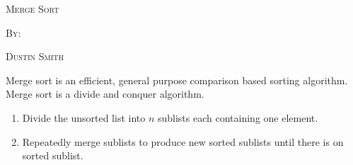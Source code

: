 \documentclass[12pt,dvipsnames,svgnames,x11names]{article}
\begin{document}
%
\pagecolor{gray!50}
\begin{center}
  \begin{center}
  \vspace*{\fill}
  \textsc{\LARGE Merge Sort}
  \par\bigskip
  \textsc{By:}
  \par\bigskip
  \textsc{\LARGE Dustin Smith}
  \vspace*{\fill}
\end{center}
\end{center}

\newpage

Merge sort is an efficient, general purpose comparison based sorting algorithm. Merge sort is a divide
and conquer algorithm.
\begin{enumerate}
	\item Divide the unsorted list into \(n\) sublists each containing one element.
	\item Repeatedly merge sublists to produce new sorted sublists until there is on sorted sublist.
\end{enumerate}
\end{document}
